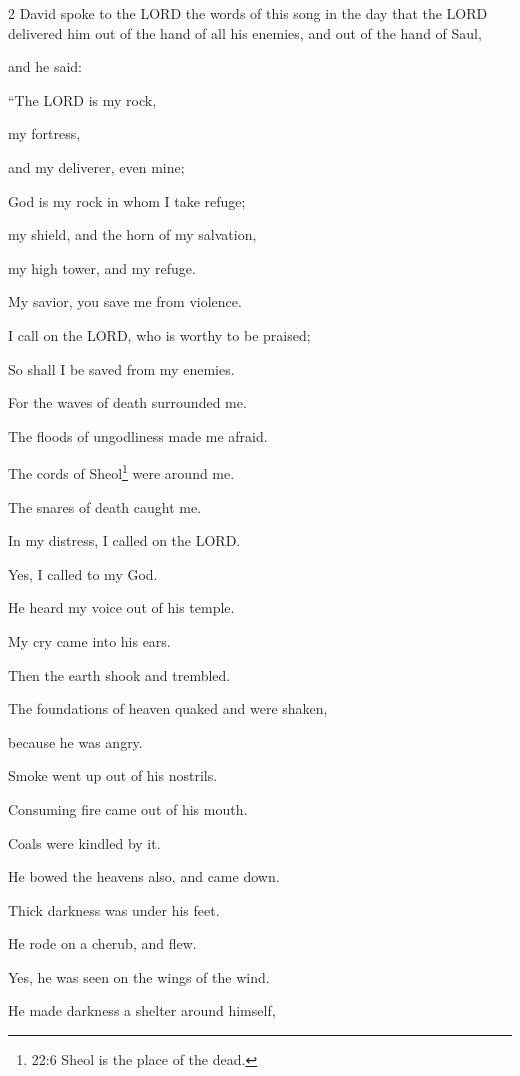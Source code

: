 \mychapter{}
\begin{multicols}{2}
 \myverse*{}David spoke to the LORD the words of this song in the day that
the LORD delivered him out of the hand of all his enemies, and out of the hand of Saul,

\myverse{}and he said:

“The LORD is my rock,

my fortress,

and my deliverer, even mine;

\myverse{}God is my rock in whom I take refuge;

my shield, and the horn of my salvation,

my high tower, and my refuge.

My savior, you save me from violence.

\myverse{}I call on the LORD, who is worthy to be praised;

So shall I be saved from my enemies.


\vspace{\baselineskip} 
\myverse{}For the waves of death surrounded me.

The floods of ungodliness made me afraid.

\myverse{}The cords of Sheol\footnote{22:6 Sheol is the place of the dead.} were around me.

The snares of death caught me.

\myverse{}In my distress, I called on the LORD.

Yes, I called to my God.

He heard my voice out of his temple.

My cry came into his ears.

\myverse{}Then the earth shook and trembled.

The foundations of heaven quaked and were shaken,

because he was angry.

\myverse{}Smoke went up out of his nostrils.

Consuming fire came out of his mouth.

Coals were kindled by it.

\myverse{}He bowed the heavens also, and came down.

Thick darkness was under his feet.

\myverse{}He rode on a cherub, and flew.

Yes, he was seen on the wings of the wind.

\myverse{}He made darkness a shelter around himself,


\end{multicols}

